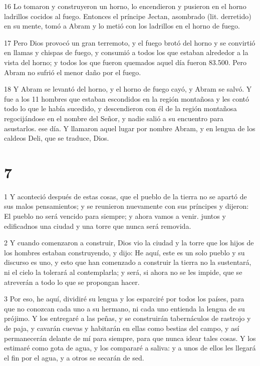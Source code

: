 \par 16 Lo tomaron y construyeron un horno, lo encendieron y pusieron en el horno ladrillos cocidos al fuego. Entonces el príncipe Jectan, asombrado (lit. derretido) en su mente, tomó a Abram y lo metió con los ladrillos en el horno de fuego.

\par 17 Pero Dios provocó un gran terremoto, y el fuego brotó del horno y se convirtió en llamas y chispas de fuego, y consumió a todos los que estaban alrededor a la vista del horno; y todos los que fueron quemados aquel día fueron 83.500. Pero Abram no sufrió el menor daño por el fuego.

\par 18 Y Abram se levantó del horno, y el horno de fuego cayó, y Abram se salvó. Y fue a los 11 hombres que estaban escondidos en la región montañosa y les contó todo lo que le había sucedido, y descendieron con él de la región montañosa regocijándose en el nombre del Señor, y nadie salió a su encuentro para asustarlos. ese día. Y llamaron aquel lugar por nombre Abram, y en lengua de los caldeos Deli, que se traduce, Dios.



\chapter{7}

\par 1 Y aconteció después de estas cosas, que el pueblo de la tierra no se apartó de sus malos pensamientos; y se reunieron nuevamente con sus príncipes y dijeron: El pueblo no será vencido para siempre; y ahora vamos a venir. juntos y edificadnos una ciudad y una torre que nunca será removida.

\par 2 Y cuando comenzaron a construir, Dios vio la ciudad y la torre que los hijos de los hombres estaban construyendo, y dijo: He aquí, este es un solo pueblo y su discurso es uno, y esto que han comenzado a construir la tierra no la sustentará, ni el cielo la tolerará al contemplarla; y será, si ahora no se les impide, que se atreverán a todo lo que se propongan hacer.

\par 3 Por eso, he aquí, dividiré su lengua y los esparciré por todos los países, para que no conozcan cada uno a su hermano, ni cada uno entienda la lengua de su prójimo. Y los entregaré a las peñas, y se construirán tabernáculos de rastrojo y de paja, y cavarán cuevas y habitarán en ellas como bestias del campo, y así permanecerán delante de mí para siempre, para que nunca idear tales cosas. Y los estimaré como gota de agua, y los compararé a saliva: y a unos de ellos les llegará el fin por el agua, y a otros se secarán de sed.

